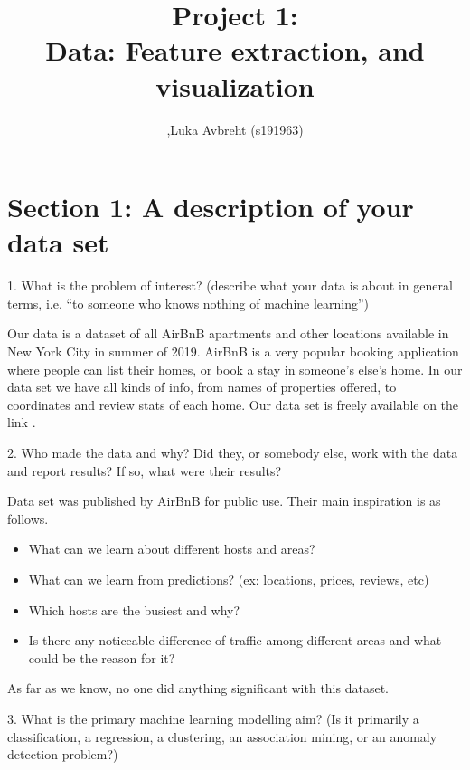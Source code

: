 \documentclass[]{report}
\title{Project 1: \\ Data: Feature extraction, and visualization}
\author{ ,Luka Avbreht (s191963)}
\begin{document}
\maketitle


\section{Section 1: A description of your data set}


1. What is the problem of interest? (describe what your data is about in general terms, i.e. “to someone who knows nothing of machine learning”)

Our data is a dataset of all AirBnB apartments and other locations available in New York City in summer of 2019. AirBnB is a very popular booking application where people can list their homes, or book a stay in someone's else's home. In our data set we have all kinds of info, from names of properties offered, to coordinates and review stats of each home. Our data set is freely available on the link \cite{data_website}.


\hspace{1cm}

2. Who made the data and why? Did they, or somebody else, work with the data and report results? If so, what were their results?

Data set was published by AirBnB for public use. Their main inspiration is as follows.
\begin{itemize}
	\item What can we learn about different hosts and areas?
	\item What can we learn from predictions? (ex: locations, prices, reviews, etc)
	\item Which hosts are the busiest and why?
	\item Is there any noticeable difference of traffic among different areas and what could be the reason for it?
\end{itemize}

As far as we know, no one did anything significant with this dataset.

\hspace{1cm}
3. What is the primary machine learning modelling aim? (Is it primarily a classification, a regression, a clustering, an association mining, or an anomaly detection problem?)
\end{document}
